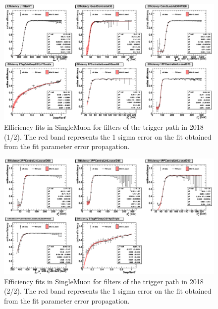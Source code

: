 
\begin{figure}[htbp!]
\begin{center}
    \includegraphics[width=0.9\linewidth]{Figures/AnalysisStrategy/triggerfits/TriggerEfficiencies_2018_TTBarCut_SingleMuon_2018_1_Fit.png}
\end{center}
\caption[Efficiency fits in SingleMuon for filters of the trigger path in 2018 (1/2)]{Efficiency fits in SingleMuon for filters of the trigger path in 2018 (1/2). The red band represents the 1 sigma error on the fit obtained from the fit parameter error propagation.}
\label{trigger:fig:SingleMuonFilterEfficiency2018_1}
\end{figure}

\begin{figure}[htbp!]
\begin{center}
    \includegraphics[width=0.9\linewidth]{Figures/AnalysisStrategy/triggerfits/TriggerEfficiencies_2018_TTBarCut_SingleMuon_2018_2_Fit.png}
\end{center}
\caption[Efficiency fits in SingleMuon for filters of the trigger path in 2018 (2/2)]{Efficiency fits in SingleMuon for filters of the trigger path in 2018 (2/2). The red band represents the 1 sigma error on the fit obtained from the fit parameter error propagation.}
\label{trigger:fig:SingleMuonFilterEfficiency2018_2}
\end{figure}
    
